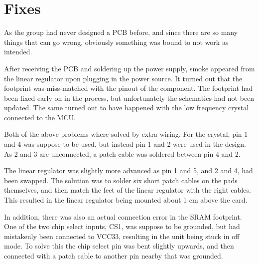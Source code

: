 
\section{Fixes}

As the group had never designed a PCB before, and since there
are so many things that can go wrong, obviously something was
bound to not work as intended.

After receiving the PCB and soldering up the power supply, smoke
appeared from the linear regulator upon plugging in the power
source. It turned out that the footprint was miss-matched with
the pinout of the component. The footprint had been fixed early
on in the process, but unfortunately the schematics had not been
updated. The same turned out to have happened with the low
frequency crystal connected to the MCU.

Both of the above problems where solved by extra wiring. For the
crystal, pin 1 and 4 was suppose to be used, but instead pin 1
and 2 were used in the design. As 2 and 3 are unconnected, a
patch cable was soldered between pin 4 and 2.

The linear regulator was slightly more advanced as pin 1 and 5,
and 2 and 4, had been swapped. The solution was to solder six
short patch cables on the pads themselves, and then match the
feet of the linear regulator with the right cables. This
resulted in the linear regulator being mounted about 1 cm above
the card. 

In addition, there was also an actual connection error in the
SRAM footprint. One of the two chip select inputs, CS1, was
suppose to be grounded, but had mistakenly been connected to
VCC33, resulting in the unit being stuck in off mode. To solve
this the chip select pin was bent slightly upwards, and then
connected with a patch cable to another pin nearby that was
grounded. 
